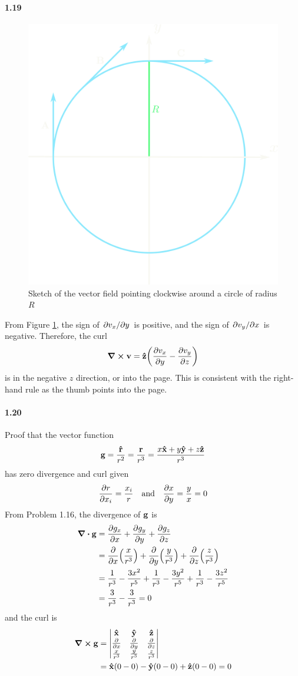 \documentclass[../main.tex]{subfiles}
\begin{document}
\paragraph{1.19}
\begin{figure}[ht]
    \centering
    \includegraphics[width=0.4\linewidth]{images/fig1_19.png}
    \caption{Sketch of the vector field pointing clockwise around a circle of radius $R$}
    \label{fig:1.19}
\end{figure}
From Figure \ref{fig:1.19}, the sign of $\pdv*{v_x}{y}$ is positive, and the sign of $\pdv*{v_y}{x}$
is negative. Therefore, the curl
\begin{align*}
    \curl{\vb{v}} = \vu{z} \quantity(\pdv{v_x}{y} - \pdv{v_y}{z}) 
\end{align*}
is in the negative $z$ direction, or into the page. This is consistent with the right-hand rule as
the thumb points into the page.

\paragraph{1.20}
Proof that the vector function
\begin{align*}
    \vb{g} = \frac{\vu{r}}{r^2} = \frac{\vb{r}}{r^3} = \frac{x\vu{x} + y\vu{y} + z\vu{z}}{r^3}
\end{align*}
has zero divergence and curl given
\begin{align*}
    \pdv{r}{x_i} = \frac{x_i}{r} \qand \pdv{x}{y} = \frac{y}{x} = 0
\end{align*}
From Problem 1.16, the divergence of $\vb{g}$ is
\begin{align*}
    \div{\vb{g}} &= \pdv{g_x}{x} + \pdv{g_y}{y} + \pdv{g_z}{z} \\
    &= \pdv{x}(\frac{x}{r^3}) + \pdv{y}(\frac{y}{r^3}) + \pdv{z}(\frac{z}{r^3}) \\
    &= \frac{1}{r^3} - \frac{3x^2}{r^5} + \frac{1}{r^3} - \frac{3y^2}{r^5}
        + \frac{1}{r^3} - \frac{3z^2}{r^5} \\
    &= \frac{3}{r^3} - \frac{3}{r^3} = 0
\end{align*}
and the curl is
\begin{align*}
    \curl{\vb{g}} &= \begin{vmatrix}
        \vu{x} & \vu{y} & \vu{z} \\
        \pdv{x} & \pdv{y} & \pdv{z} \\
        \frac{x}{r^3} & \frac{y}{r^3} & \frac{z}{r^3}
    \end{vmatrix} \\
    &= \vu{x} (0 - 0) - \vu{y} (0 - 0) + \vu{z} (0 - 0) = 0
\end{align*}
\end{document}
